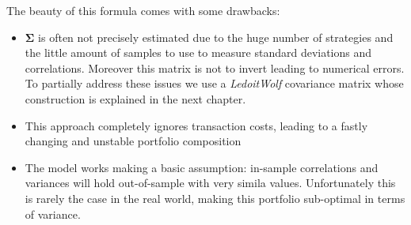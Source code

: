 The beauty of this formula comes with some drawbacks:
\begin{itemize}
	\item $\mathbf{\Sigma}$ is often not precisely estimated due to the huge number of strategies and the little amount of samples to use to measure standard deviations and correlations. Moreover this matrix is not to invert leading to numerical errors. To partially address these issues we use a \textit{LedoitWolf} covariance matrix whose construction is explained in the next chapter.
	\item This approach completely ignores transaction costs, leading to a fastly changing and unstable portfolio composition
	\item The model works making a basic assumption: in-sample correlations and variances will hold out-of-sample with very simila values. Unfortunately this is rarely the case in the real world, making this portfolio sub-optimal in terms of variance.
\end{itemize}